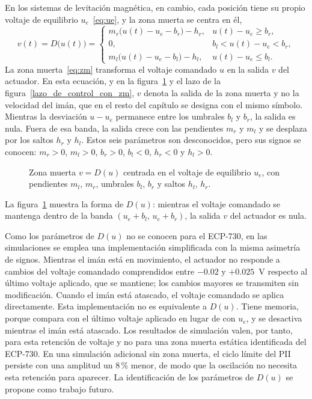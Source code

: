 En los sistemas de levitación magnética, en cambio, cada posición tiene su propio voltaje de equilibrio $u_e$~\eqref{eq:ue}, y la zona muerta se centra en él,
\begin{equation}
v(t) = D\big(u(t)\big) =
\begin{cases}
m_r \big(u(t) - u_e - b_r\big) - h_r, & u(t) - u_e \ge b_r, \\[6pt]
0, & b_l < u(t) - u_e < b_r, \\[6pt]
m_l \big(u(t) - u_e - b_l\big) - h_l, & u(t) - u_e \le b_l.
\end{cases}
\label{eq:zm}
\end{equation}
La zona muerta~\eqref{eq:zm} transforma el voltaje comandado $u$ en la salida $v$ del actuador. En esta ecuación, y en la figura~\ref{fig:zm} y el lazo de la figura~\ref{lazo_de_control_con_zm}, $v$ denota la salida de la zona muerta y no la velocidad del imán, que en el resto del capítulo se designa con el mismo símbolo. Mientras la desviación $u-u_e$ permanece entre los umbrales $b_l$ y $b_r$, la salida es nula. Fuera de esa banda, la salida crece con las pendientes $m_r$ y $m_l$ y se desplaza por los saltos $h_r$ y $h_l$. Estos seis parámetros son desconocidos, pero sus signos se conocen: $m_r > 0$, $m_l > 0$, $b_r > 0$, $b_l < 0$, $h_r < 0$ y $h_l > 0$.


\begin{figure}[ht]
    \centering
    
    \caption[Zona muerta centrada en el voltaje de equilibrio]{Zona muerta $v=D(u)$ centrada en el voltaje de equilibrio $u_e$, con pendientes $m_l$, $m_r$, umbrales $b_l$, $b_r$ y saltos $h_l$, $h_r$.}
    \label{fig:zm}
\end{figure}

La figura~\ref{fig:zm} muestra la forma de $D(u)$: mientras el voltaje comandado se mantenga dentro de la banda $(u_e+b_l,\,u_e+b_r)$, la salida $v$ del actuador es nula.

Como los parámetros de $D(u)$ no se conocen para el ECP-730, en las simulaciones se emplea una implementación simplificada con la misma asimetría de signos. Mientras el imán está en movimiento, el actuador no responde a cambios del voltaje comandado comprendidos entre $-0.02$ y $+0.025$~V respecto al último voltaje aplicado, que se mantiene; los cambios mayores se transmiten sin modificación. Cuando el imán está atascado, el voltaje comandado se aplica directamente. Esta implementación no es equivalente a $D(u)$. Tiene memoria, porque compara con el último voltaje aplicado en lugar de con $u_e$, y se desactiva mientras el imán está atascado. Los resultados de simulación valen, por tanto, para esta retención de voltaje y no para una zona muerta estática identificada del ECP-730. En una simulación adicional sin zona muerta, el ciclo límite del PII persiste con una amplitud un 8\,\% menor, de modo que la oscilación no necesita esta retención para aparecer. La identificación de los parámetros de $D(u)$ se propone como trabajo futuro.

